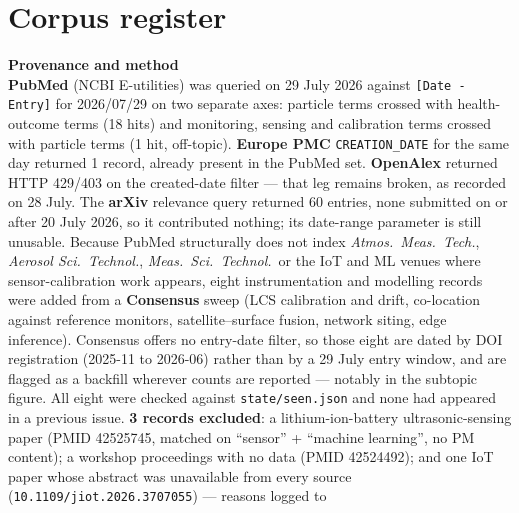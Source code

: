 \documentclass[10pt]{article}
\begin{document}
\clearpage

\section*{\sffamily\bfseries\color{Deep}Corpus register}
\vspace{-1.5mm}{\color{Amber}\rule{\linewidth}{1.1pt}}\vspace{2.5mm}



\vspace{4mm}
\begin{keybox}
{\sffamily\bfseries\footnotesize\color{Deep}Provenance and method}\\[1.2mm]
{\fontsize{7.2}{8.8}\selectfont
\textbf{PubMed} (NCBI E-utilities) was queried on 29 July 2026 against
\texttt{[Date - Entry]} for 2026/07/29 on two separate axes: particle terms crossed with
health-outcome terms (18 hits) and monitoring, sensing and calibration terms crossed with
particle terms (1 hit, off-topic). \textbf{Europe PMC} \texttt{CREATION\_DATE} for the
same day returned 1 record, already present in the PubMed set. \textbf{OpenAlex} returned
HTTP 429/403 on the created-date filter --- that leg remains broken, as recorded on
28 July. The \textbf{arXiv} relevance query returned 60 entries, none submitted on or
after 20 July 2026, so it contributed nothing; its date-range parameter is still
unusable. Because PubMed structurally does not index \textit{Atmos.\ Meas.\ Tech.},
\textit{Aerosol Sci.\ Technol.}, \textit{Meas.\ Sci.\ Technol.}\ or the IoT and ML venues
where sensor-calibration work appears, eight instrumentation and modelling records were
added from a \textbf{Consensus} sweep (LCS calibration and drift, co-location against
reference monitors, satellite--surface fusion, network siting, edge inference). Consensus
offers no entry-date filter, so those eight are dated by DOI registration (2025-11 to
2026-06) rather than by a 29 July entry window, and are flagged as a backfill wherever
counts are reported --- notably in the subtopic figure. All eight were checked against
\texttt{state/seen.json} and none had appeared in a previous issue.
\textbf{3 records excluded}: a lithium-ion-battery ultrasonic-sensing paper
(PMID 42525745, matched on ``sensor'' + ``machine learning'', no PM content); a workshop
proceedings with no data (PMID 42524492); and one IoT paper whose abstract was
unavailable from every source (\texttt{10.1109/jiot.2026.3707055}) --- reasons logged to
}
\end{keybox}
\end{document}
